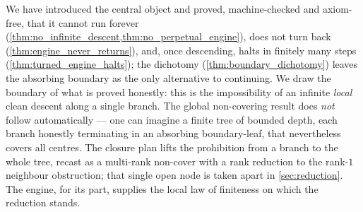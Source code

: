 \medskip

We have introduced the central object and proved, machine-checked and axiom-free, that it cannot
run forever (\cref{thm:no_infinite_descent,thm:no_perpetual_engine}), does not turn back
(\cref{thm:engine_never_returns}), and, once descending, halts in finitely many steps
(\cref{thm:turned_engine_halts}); the dichotomy (\cref{thm:boundary_dichotomy}) leaves the absorbing
boundary as the only alternative to continuing. We draw the boundary of what is proved honestly:
this is the impossibility of an infinite \emph{local} clean descent along a single branch. The
global non-covering result does \emph{not} follow automatically --- one can imagine a finite tree of
bounded depth, each branch honestly terminating in an absorbing boundary-leaf, that nevertheless
covers all centres. The closure plan lifts the prohibition from a branch to the whole tree, recast
as a multi-rank non-cover with a rank reduction to the rank-$1$ neighbour obstruction; that single
open node is taken apart in \cref{sec:reduction}. The engine, for its part, supplies the local law
of finiteness on which the reduction stands.
